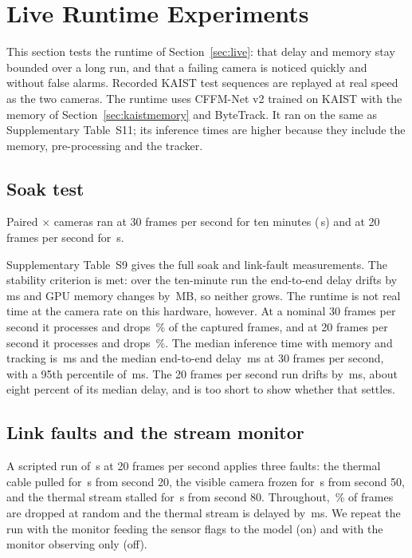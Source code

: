 \section{Live Runtime Experiments}
\label{sec:livexp}
This section tests the runtime of Section~\ref{sec:live}: that delay and memory stay bounded over a long run, and that a failing camera is noticed quickly and without false alarms. Recorded KAIST test sequences are replayed at real speed as the two cameras. The runtime uses CFFM-Net v2 trained on KAIST with the memory of Section~\ref{sec:kaistmemory} and ByteTrack. It ran on the same \latLocalDevice{} as Supplementary Table~S11; its inference times are higher because they include the memory, pre-processing and the tracker.

\subsection{Soak test}
\label{sec:soak}
Paired \cfgLatW{}$\times$\cfgLatH{} cameras ran at 30 frames per second for ten minutes (\livSoakThirtySeconds{}\,s) and at 20 frames per second for \cfgSoakShortSeconds{}\,s.

Supplementary Table~S9 gives the full soak and link-fault measurements. The stability criterion is met: over the ten-minute run the end-to-end delay drifts by \livSoakThirtyDriftMs{}\,ms and GPU memory changes by \livSoakThirtyGpuGrowthMb{}\,MB, so neither grows. The runtime is not real time at the camera rate on this hardware, however. At a nominal 30 frames per second it processes \livSoakThirtyFps{} and drops \livSoakThirtyDropPercent{}\,\% of the captured frames, and at 20 frames per second it processes \livSoakTwentyFps{} and drops \livSoakTwentyDropPercent{}\,\%. The median inference time with memory and tracking is \livSoakThirtyInferMedianMs{}\,ms and the median end-to-end delay \livSoakThirtyEndToEndMedianMs{}\,ms at 30 frames per second, with a 95th percentile of \livSoakThirtyEndToEndPNinetyFiveMs{}\,ms. The 20 frames per second run drifts by \livSoakTwentyDriftMs{}\,ms, about eight percent of its median delay, and is too short to show whether that settles.

\subsection{Link faults and the stream monitor}
\label{sec:linkfaults}
A scripted run of \cfgLinkSeconds{}\,s at 20 frames per second applies three faults: the thermal cable pulled for \cfgUnplugSeconds{}\,s from second 20, the visible camera frozen for \cfgUnplugSeconds{}\,s from second 50, and the thermal stream stalled for \cfgStallSeconds{}\,s from second 80. Throughout, \cfgLinkDropPercent{}\,\% of frames are dropped at random and the thermal stream is delayed by \cfgLinkDelayMs{}\,ms. We repeat the run with the monitor feeding the sensor flags to the model (on) and with the monitor observing only (off).

